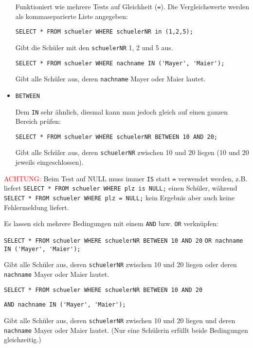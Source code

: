 \begin{itemize}
	Funktioniert wie mehrere Tests auf Gleichheit (\lstinline!=!). Die Vergleichswerte werden als kommaseparierte Liste angegeben:

	\lstinline!SELECT * FROM schueler WHERE schuelerNR in (1,2,5);!

	Gibt die Schüler mit den \lstinline!schuelerNR! 1, 2 und 5 aus.

	\lstinline!SELECT * FROM schueler WHERE nachname IN ('Mayer', 'Maier');!

	Gibt alle Schüler aus, deren \lstinline!nachname! Mayer oder Maier lautet.
	\item \lstinline!BETWEEN!

	Dem \lstinline!IN! sehr ähnlich, diesmal kann man jedoch gleich auf einen ganzen Bereich prüfen:

	\lstinline!SELECT * FROM schueler WHERE schuelerNR BETWEEN 10 AND 20;!

	Gibt alle Schüler aus, deren \lstinline!schuelerNR! zwischen 10 und 20 liegen (10 und 20 jeweils eingeschlossen).
\end{itemize}
\textcolor{red}{ACHTUNG:} Beim Test auf NULL muss immer \lstinline!IS! statt \lstinline!=! verwendet werden, z.B. liefert \lstinline!SELECT * FROM schueler WHERE plz is NULL;! einen Schüler, während \lstinline!SELECT * FROM schueler WHERE plz = NULL;! kein Ergebnis aber auch keine Fehlermeldung liefert.

Es lassen sich mehrere Bedingungen mit einem \lstinline!AND! bzw. \lstinline!OR! verknüpfen:

\lstinline!SELECT * FROM schueler WHERE schuelerNR BETWEEN 10 AND 20!
\lstinline!OR nachname IN ('Mayer', 'Maier');!

Gibt alle Schüler aus, deren \lstinline!schuelerNR! zwischen 10 und 20 liegen oder deren \lstinline!nachname! Mayer oder Maier lautet.

\lstinline!SELECT * FROM schueler WHERE schuelerNR BETWEEN 10 AND 20!

\lstinline!AND nachname IN ('Mayer', 'Maier');!

Gibt alle Schüler aus, deren \lstinline!schuelerNR! zwischen 10 und 20 liegen und deren \lstinline!nachname! Mayer oder Maier lautet. (Nur eine Schülerin erfüllt beide Bedingungen gleichzeitig.)

